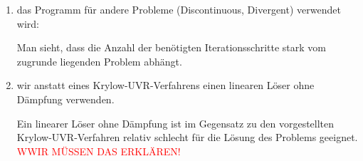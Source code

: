 \documentclass[12pt,a4paper]{scrartcl}
\numberwithin{equation}{section}
\begin{document}
\begin{enumerate}
	\item das Programm für andere Probleme (Discontinuous, Divergent) verwendet wird:
	\begin{figure}[H]
		\centering
		\end{figure}
	Man sieht, dass die Anzahl der benötigten Iterationsschritte stark vom zugrunde liegenden Problem abhängt. 
	
    
	
	\item wir anstatt eines Krylow-UVR-Verfahrens einen linearen Löser ohne Dämpfung verwenden.
	
	\begin{figure}[H]
		\centering
		
	\end{figure}
	
	Ein linearer Löser ohne Dämpfung ist im Gegensatz zu den vorgestellten Krylow-UVR-Verfahren relativ schlecht für die Lösung des Problems geeignet. 
	\textcolor{red}{WWIR MÜSSEN DAS ERKLÄREN!}
\end{enumerate}
\end{document}
